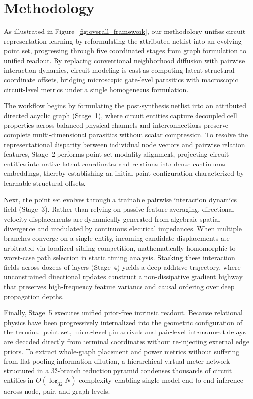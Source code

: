 \section{Methodology}
\label{sec:method}

As illustrated in Figure~\ref{fig:overall_framework}, our methodology unifies circuit representation learning by reformulating the attributed netlist into an evolving point set, progressing through five coordinated stages from graph formulation to unified readout. By replacing conventional neighborhood diffusion with pairwise interaction dynamics, circuit modeling is cast as computing latent structural coordinate offsets, bridging microscopic gate-level parasitics with macroscopic circuit-level metrics under a single homogeneous formulation.

The workflow begins by formulating the post-synthesis netlist into an attributed directed acyclic graph (Stage~1), where circuit entities capture decoupled cell properties across balanced physical channels and interconnections preserve complete multi-dimensional parasitics without scalar compression. To resolve the representational disparity between individual node vectors and pairwise relation features, Stage~2 performs point-set modality alignment, projecting circuit entities into native latent coordinates and relations into dense continuous embeddings, thereby establishing an initial point configuration characterized by learnable structural offsets.

Next, the point set evolves through a trainable pairwise interaction dynamics field (Stage~3). Rather than relying on passive feature averaging, directional velocity displacements are dynamically generated from algebraic spatial divergence and modulated by continuous electrical impedances. When multiple branches converge on a single entity, incoming candidate displacements are arbitrated via localized sibling competition, mathematically homomorphic to worst-case path selection in static timing analysis. Stacking these interaction fields across dozens of layers (Stage~4) yields a deep additive trajectory, where unconstrained directional updates construct a non-dissipative gradient highway that preserves high-frequency feature variance and causal ordering over deep propagation depths.

Finally, Stage~5 executes unified prior-free intrinsic readout. Because relational physics have been progressively internalized into the geometric configuration of the terminal point set, micro-level pin arrivals and pair-level interconnect delays are decoded directly from terminal coordinates without re-injecting external edge priors. To extract whole-graph placement and power metrics without suffering from flat-pooling information dilution, a hierarchical virtual meter network structured in a 32-branch reduction pyramid condenses thousands of circuit entities in $O(\log_{32} N)$ complexity, enabling single-model end-to-end inference across node, pair, and graph levels.

